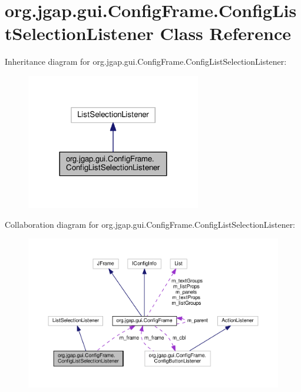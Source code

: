 \hypertarget{classorg_1_1jgap_1_1gui_1_1_config_frame_1_1_config_list_selection_listener}{\section{org.\-jgap.\-gui.\-Config\-Frame.\-Config\-List\-Selection\-Listener Class Reference}
\label{classorg_1_1jgap_1_1gui_1_1_config_frame_1_1_config_list_selection_listener}
}


Inheritance diagram for org.\-jgap.\-gui.\-Config\-Frame.\-Config\-List\-Selection\-Listener\-:
\nopagebreak
\begin{figure}[H]
\begin{center}
\leavevmode
\includegraphics[width=216pt]{classorg_1_1jgap_1_1gui_1_1_config_frame_1_1_config_list_selection_listener__inherit__graph}
\end{center}
\end{figure}


Collaboration diagram for org.\-jgap.\-gui.\-Config\-Frame.\-Config\-List\-Selection\-Listener\-:
\nopagebreak
\begin{figure}[H]
\begin{center}
\leavevmode
\includegraphics[width=350pt]{classorg_1_1jgap_1_1gui_1_1_config_frame_1_1_config_list_selection_listener__coll__graph}
\end{center}
\end{figure}

